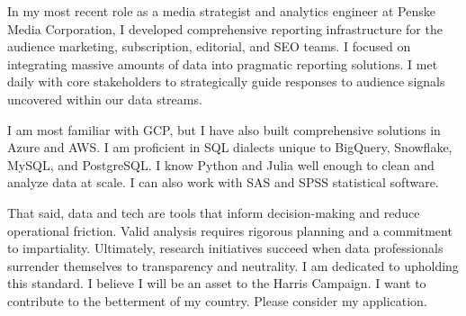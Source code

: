 \documentclass{cover-letter-class}
\begin{document}
{    \vspace{1em}

    In my most recent role as a media strategist and analytics engineer at Penske Media Corporation, I developed comprehensive reporting infrastructure for the audience marketing, subscription, editorial, and SEO teams. I focused on integrating massive amounts of data into pragmatic reporting solutions. I met daily with core stakeholders to strategically guide responses to audience signals uncovered within our data streams.  
    
    \vspace{1em}

    I am most familiar with GCP, but I have also built comprehensive solutions in Azure and AWS. I am proficient in SQL dialects unique to BigQuery, Snowflake, MySQL, and PostgreSQL. I know Python and Julia well enough to clean and analyze data at scale. I can also work with SAS and SPSS statistical software.  
    
    \vspace{1em}
    That said, data and tech are tools that inform decision-making and reduce operational friction. Valid analysis requires rigorous planning and a commitment to impartiality. Ultimately, research initiatives succeed when data professionals surrender themselves to transparency and neutrality. I am dedicated to upholding this standard. I believe I will be an asset to the Harris Campaign. I want to contribute to the betterment of my country. Please consider my application.


    
    \vspace{1em}
    


    
    \vspace{1em}

}
\end{document}
